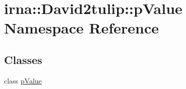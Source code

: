 \hypertarget{namespaceirna_1_1David2tulip_1_1pValue}{
\section{irna\-:\-:\-David2tulip\-:\-:p\-Value \-Namespace \-Reference}
\label{namespaceirna_1_1David2tulip_1_1pValue}
}
\subsection*{\-Classes}
\begin{DoxyCompactItemize}
\item 
class \hyperlink{classirna_1_1David2tulip_1_1pValue_1_1pValue}{p\-Value}
\end{DoxyCompactItemize}
